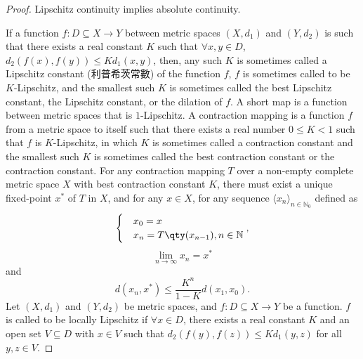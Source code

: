 \documentclass[a4paper,12pt]{report}
\begin{document}
\begin{itemize}
\begin{itemize}
\begin{proof}
Lipschitz continuity implies absolute continuity.

If a function $f\colon D\subseteq X\to Y$ between metric spaces $(X,d_1)$ and $(Y,d_2)$ is such that there exists a real constant $K$ such that $\forall x,y\in D$, $d_{2}(f(x),f(y))\leq Kd_{1}(x,y)$, then, any such $K$ is sometimes called a Lipschitz constant (利普希茨常數) of the function $f$, $f$ is sometimes called to be $K$-Lipschitz, and the smallest such $K$ is sometimes called the best Lipschitz constant, the Lipschitz constant, or the dilation of $f$.
A short map is a function between metric spaces that is $1$-Lipschitz.
A contraction mapping is a function $f$ from a metric space to itself such that there exists a real number $0\leq K<1$ such that $f$ is $K$-Lipschitz, in which $K$ is sometimes called a contraction constant and the smallest such $K$ is sometimes called the best contraction constant or the contraction constant.
For any contraction mapping $T$ over a non-empty complete metric space $X$ with best contraction constant $K$, there must exist a unique fixed-point $x^*$ of $T$ in $X$, and for any $x\in X$, for any sequence $\langle x_n\rangle_{n\in \mathbb {N}_0}$ defined as
\[\begin{cases}
&x_0=x\\
&x_n=T\qty(x_{n-1}),n\in\mathbb{N}
\end{cases},\]
\[\lim_{n\to \infty }x_{n}=x^{*}\]
and
\[d(x_n,x^*)\leq\frac{K^n}{1-K}d(x_1,x_0).\]
Let $(X,d_1)$ and $(Y,d_2)$ be metric spaces, and $f\colon D\subseteq X\to Y$ be a function. $f$ is called to be locally Lipschitz if $\forall x\in D$, there exists a real constant $K$ and an open set $V\subseteq D$ with $x\in V$ such that $d_{2}(f(y),f(z))\leq Kd_{1}(y,z)$ for all $y,z\in V$.


\end{proof}
\end{itemize}
\end{itemize}
\end{document}
